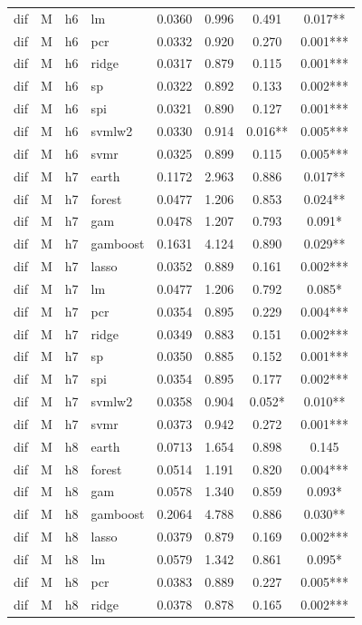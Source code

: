 \begin{ThreePartTable}
\begin{longtable}[t]{llclcccc}
dif & M & h6 & lm & 0.0360 & 0.996 & 0.491 & 0.017**\\
dif & M & h6 & pcr & 0.0332 & 0.920 & 0.270 & 0.001***\\
dif & M & h6 & ridge & 0.0317 & 0.879 & 0.115 & 0.001***\\
dif & M & h6 & sp & 0.0322 & 0.892 & 0.133 & 0.002***\\
dif & M & h6 & spi & 0.0321 & 0.890 & 0.127 & 0.001***\\
dif & M & h6 & svmlw2 & 0.0330 & 0.914 & 0.016** & 0.005***\\
dif & M & h6 & svmr & 0.0325 & 0.899 & 0.115 & 0.005***\\
\addlinespace
dif & M & h7 & earth & 0.1172 & 2.963 & 0.886 & 0.017**\\
dif & M & h7 & forest & 0.0477 & 1.206 & 0.853 & 0.024**\\
dif & M & h7 & gam & 0.0478 & 1.207 & 0.793 & 0.091*\\
dif & M & h7 & gamboost & 0.1631 & 4.124 & 0.890 & 0.029**\\
dif & M & h7 & lasso & 0.0352 & 0.889 & 0.161 & 0.002***\\
dif & M & h7 & lm & 0.0477 & 1.206 & 0.792 & 0.085*\\
dif & M & h7 & pcr & 0.0354 & 0.895 & 0.229 & 0.004***\\
dif & M & h7 & ridge & 0.0349 & 0.883 & 0.151 & 0.002***\\
dif & M & h7 & sp & 0.0350 & 0.885 & 0.152 & 0.001***\\
dif & M & h7 & spi & 0.0354 & 0.895 & 0.177 & 0.002***\\
dif & M & h7 & svmlw2 & 0.0358 & 0.904 & 0.052* & 0.010**\\
dif & M & h7 & svmr & 0.0373 & 0.942 & 0.272 & 0.001***\\
\addlinespace
dif & M & h8 & earth & 0.0713 & 1.654 & 0.898 & 0.145\\
dif & M & h8 & forest & 0.0514 & 1.191 & 0.820 & 0.004***\\
dif & M & h8 & gam & 0.0578 & 1.340 & 0.859 & 0.093*\\
dif & M & h8 & gamboost & 0.2064 & 4.788 & 0.886 & 0.030**\\
dif & M & h8 & lasso & 0.0379 & 0.879 & 0.169 & 0.002***\\
dif & M & h8 & lm & 0.0579 & 1.342 & 0.861 & 0.095*\\
dif & M & h8 & pcr & 0.0383 & 0.889 & 0.227 & 0.005***\\
dif & M & h8 & ridge & 0.0378 & 0.878 & 0.165 & 0.002***\\

\end{longtable}
\end{ThreePartTable}
